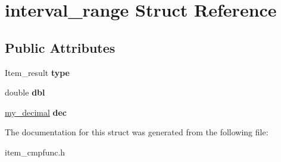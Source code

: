 \hypertarget{structinterval__range}{}\section{interval\+\_\+range Struct Reference}
\label{structinterval__range}
\subsection*{Public Attributes}
\begin{DoxyCompactItemize}
\item 
\mbox{\label{structinterval__range_a00ae315193dff6debdb242a9833b3158}} 
Item\+\_\+result {\bfseries type}
\item 
\mbox{\label{structinterval__range_a223e4783ffd8c5f831f6bd6409d4c8c1}} 
double {\bfseries dbl}
\item 
\mbox{\label{structinterval__range_a9b08aaa73075137b3533dbc95eac9c0a}} 
\mbox{\hyperlink{classmy__decimal}{my\+\_\+decimal}} {\bfseries dec}
\end{DoxyCompactItemize}


The documentation for this struct was generated from the following file\+:\begin{DoxyCompactItemize}
\item 
item\+\_\+cmpfunc.\+h\end{DoxyCompactItemize}
